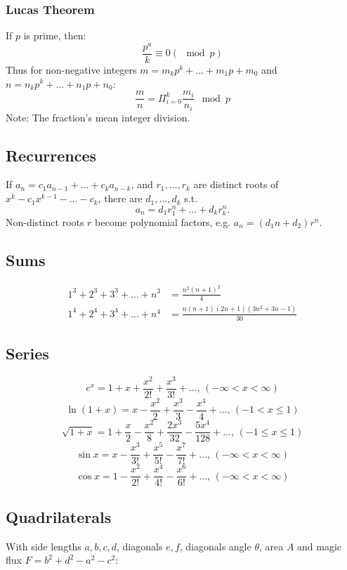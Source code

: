\documentclass[
	a4paper,
	landscape,
	10pt,
]{article}
\begin{document}
\begin{multicols}{3}
	\subsubsection*{Lucas Theorem}
		If $p$ is prime, then:
		$$ \frac{p^a}{k} \equiv 0 (\mod p) $$
		Thus for non-negative integers $m = m_kp^k + \hdots + m_1 p + m_0$ and $n = n_k p^k + \hdots + n_1p + n_0$:
		$$ \frac{m}{n} =  \Pi_{i=0}^{k} \frac{m_i}{n_i} \mod p $$ Note: The fraction's mean integer division.

    \subsection{Recurrences}
        If $a_n = c_1 a_{n-1} + \dots + c_k a_{n-k}$, and $r_1, \dots, r_k$ are distinct roots of $x^k - c_1 x^{k-1} - \dots - c_k$, there are $d_1, \dots, d_k$ s.t.
        \[a_n = d_1r_1^n + \dots + d_kr_k^n. \]
        Non-distinct roots $r$ become polynomial factors, e.g. $a_n = (d_1n + d_2)r^n$.

	\subsection{Sums} \vspace{-1cm}
		\begin{align*}
			1^3 + 2^3 + 3^3 + \dots + n^3 &= \frac{n^2(n+1)^2}{4} \\
			1^4 + 2^4 + 3^4 + \dots + n^4 &= \frac{n(n+1)(2n+1)(3n^2 + 3n - 1)}{30}
		\end{align*}
	\subsection{Series} \vspace{-1cm}
		$$e^x = 1+x+\frac{x^2}{2!}+\frac{x^3}{3!}+\dots,\,(-\infty<x<\infty)$$
		$$\ln(1+x) = x-\frac{x^2}{2}+\frac{x^3}{3}-\frac{x^4}{4}+\dots,\,(-1<x\leq1)$$
		$$\sqrt{1+x} = 1+\frac{x}{2}-\frac{x^2}{8}+\frac{2x^3}{32}-\frac{5x^4}{128}+\dots,\,(-1\leq x\leq1)$$
		$$\sin x = x-\frac{x^3}{3!}+\frac{x^5}{5!}-\frac{x^7}{7!}+\dots,\,(-\infty<x<\infty)$$
		$$\cos x = 1-\frac{x^2}{2!}+\frac{x^4}{4!}-\frac{x^6}{6!}+\dots,\,(-\infty<x<\infty)$$

	\subsection{Quadrilaterals}
        With side lengths $a,b,c,d$, diagonals $e, f$, diagonals angle $\theta$, area $A$ and
        magic flux $F=b^2+d^2-a^2-c^2$:
        

\end{multicols}
\end{document}
